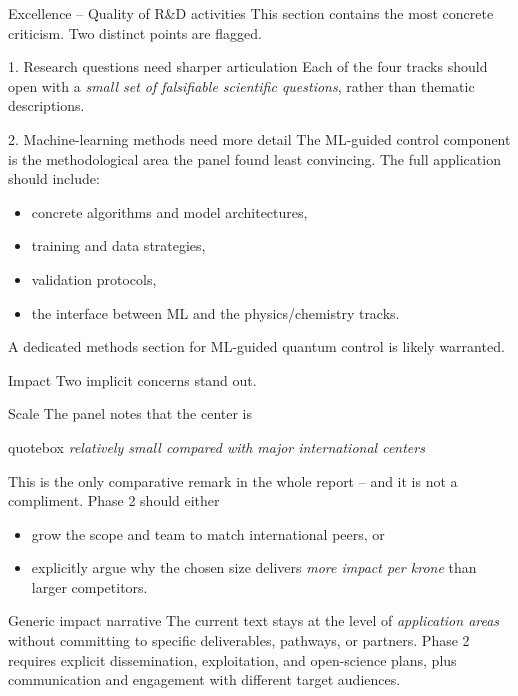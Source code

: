 \documentclass[10pt,aspectratio=169]{beamer}
\newcommand{\reviewerquote}[1]{%
  \begin{beamercolorbox}[sep=6pt,rounded=true,shadow=true]{quotebox}%
  \itshape #1%
  \end{beamercolorbox}%
}
\begin{document}
\begin{frame}{Excellence -- Quality of R\&D activities}
  This section contains the most concrete criticism. Two distinct points are flagged.
  \vfill
  \begin{block}{1. Research questions need sharper articulation}
    Each of the four tracks should open with a \emph{small set of falsifiable scientific questions},
    rather than thematic descriptions.
  \end{block}
  \begin{block}{2. Machine-learning methods need more detail}
    The ML-guided control component is the methodological area the panel found least convincing.
    The full application should include:
    \begin{itemize}
      \item concrete algorithms and model architectures,
      \item training and data strategies,
      \item validation protocols,
      \item the interface between ML and the physics/chemistry tracks.
    \end{itemize}
    A dedicated methods section for ML-guided quantum control is likely warranted.
  \end{block}
\end{frame}

\begin{frame}{Impact}
  Two implicit concerns stand out.
  \vfill
  \begin{block}{Scale}
    The panel notes that the center is
    \reviewerquote{relatively small compared with major international centers}
    \vspace{0.3em}
    This is the only comparative remark in the whole report -- and it is not a compliment.
    Phase 2 should either
    \begin{itemize}
      \item grow the scope and team to match international peers, or
      \item explicitly argue why the chosen size delivers \emph{more impact per krone} than larger competitors.
    \end{itemize}
  \end{block}
  \begin{block}{Generic impact narrative}
    The current text stays at the level of \emph{application areas} without committing to specific deliverables,
    pathways, or partners. Phase 2 requires explicit dissemination, exploitation, and open-science
    plans, plus communication and engagement with different target audiences.
  \end{block}
\end{frame}
\end{document}

